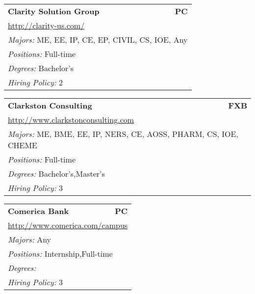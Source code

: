 \documentclass[twoside]{article}
\begin{document}
\begin{center}
\begin{multicols}{3}
\begin{FlushLeft}
\begin{minipage}{\columnwidth}
\end{minipage}
 
\begin{minipage}{\columnwidth}\begin{tabularx}{.95\columnwidth}{Xr}
                 {\Large\bf Clarity Solution Group} & {\Large\bf PC}\\
    \multicolumn{2}{p{.95\columnwidth}}{\url{http://clarity-us.com/}}\\
    \multicolumn{2}{p{.95\columnwidth}}{\emph{Majors:} ME, EE, IP, CE, EP, CIVIL, CS, IOE, Any}\\
    \multicolumn{2}{p{.95\columnwidth}}{\emph{Positions:} Full-time}\\
    \multicolumn{2}{p{.95\columnwidth}}{\emph{Degrees:} Bachelor's}\\
    \multicolumn{2}{p{.95\columnwidth}}{\emph{Hiring Policy:} 2}\\
    \end{tabularx}
    
\end{minipage}
 
\begin{minipage}{\columnwidth}\begin{tabularx}{.95\columnwidth}{Xr}
                 {\Large\bf Clarkston Consulting} & {\Large\bf FXB}\\
    \multicolumn{2}{p{.95\columnwidth}}{\url{http://www.clarkstonconsulting.com}}\\
    \multicolumn{2}{p{.95\columnwidth}}{\emph{Majors:} ME, BME, EE, IP, NERS, CE, AOSS, PHARM, CS, IOE, CHEME}\\
    \multicolumn{2}{p{.95\columnwidth}}{\emph{Positions:} Full-time}\\
    \multicolumn{2}{p{.95\columnwidth}}{\emph{Degrees:} Bachelor's,Master's}\\
    \multicolumn{2}{p{.95\columnwidth}}{\emph{Hiring Policy:} 3}\\
    \end{tabularx}
    
\end{minipage}
 
\begin{minipage}{\columnwidth}\begin{tabularx}{.95\columnwidth}{Xr}
                 {\Large\bf Comerica Bank} & {\Large\bf PC}\\
    \multicolumn{2}{p{.95\columnwidth}}{\url{http://www.comerica.com/campus}}\\
    \multicolumn{2}{p{.95\columnwidth}}{\emph{Majors:} Any}\\
    \multicolumn{2}{p{.95\columnwidth}}{\emph{Positions:} Internship,Full-time}\\
    \multicolumn{2}{p{.95\columnwidth}}{\emph{Degrees:} }\\
    \multicolumn{2}{p{.95\columnwidth}}{\emph{Hiring Policy:} 3}\\
    \end{tabularx}
    

\end{minipage}
\end{FlushLeft}
\end{multicols}
\end{center}
\end{document}
